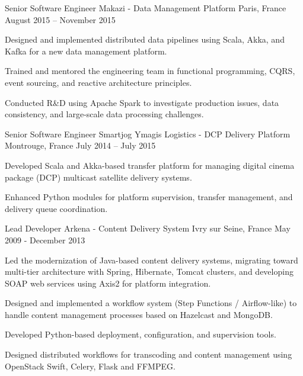 \begin{cventries}
  \cventry
    {Senior Software Engineer} %
    {Makazi - Data Management Platform} %
    {Paris, France} %
    {August 2015 – November 2015} %
    {
      \begin{cvitems} %
        \item {Designed and implemented distributed data pipelines using Scala, Akka, and Kafka for a new data management platform.}
        \item {Trained and mentored the engineering team in functional programming, CQRS, event sourcing, and reactive architecture principles.}
        \item {Conducted R\&D using Apache Spark to investigate production issues, data consistency, and large-scale data processing challenges.}
      \end{cvitems}
    }

  \cventry
    {Senior Software Engineer} %
    {Smartjog Ymagis Logistics - DCP Delivery Platform} %
    {Montrouge, France} %
    {July 2014 – July 2015} %
    {
      \begin{cvitems} %
        \item {Developed Scala and Akka-based transfer platform for managing digital cinema package (DCP) multicast satellite delivery systems.}
        \item {Enhanced Python modules for platform supervision, transfer management, and delivery queue coordination.}
      \end{cvitems}
    }

  \cventry
    {Lead Developer} %
    {Arkena - Content Delivery System} %
    {Ivry sur Seine, France} %
    {May 2009 - December 2013} %
    {
      \begin{cvitems} %
        \item {Led the modernization of Java-based content delivery systems, migrating toward multi-tier architecture with Spring, Hibernate, Tomcat clusters, and developing SOAP web services using Axis2 for platform integration.}
        \item {Designed and implemented a workflow system (Step Functions / Airflow-like) to handle content management processes based on Hazelcast and MongoDB.}
        \item {Developed Python-based deployment, configuration, and supervision tools.}
        \item {Designed distributed workflows for transcoding and content management using OpenStack Swift, Celery, Flask and FFMPEG.}
      \end{cvitems}
    }

\end{cventries}
